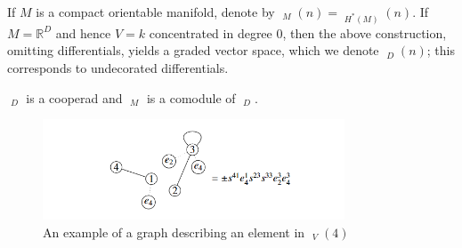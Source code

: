 \documentclass{scrartcl}
\theoremstyle{plain}
\theoremstyle{definition}
\newcommand{\R}{\mathbb R}
\DeclareMathOperator{\coGra}{{}^*Gra}
\newcommand{\blank}{-}
\begin{document}


If $M$ is a compact orientable manifold, denote by $\coGra_M(n) = \coGra_{H^*(M)}(n)$. If $M = \R^D$ and hence $V=k$ concentrated in degree $0$, then the above construction, omitting differentials, yields a graded vector space, which we denote $\coGra_D(n)$; this corresponds to undecorated differentials. 

$\coGra_D$ is a cooperad and $\coGra_M$ is a comodule of $\coGra_D$. 

\begin{figure}[ht]
    \centering
    \includegraphics[width=0.8\textwidth]{img/campos-willacher-graph-dual-example.png}
    \caption{An example of a graph describing an element in $\coGra_V(4)$}\label{cw-graph-example}
\end{figure}
\end{document}
